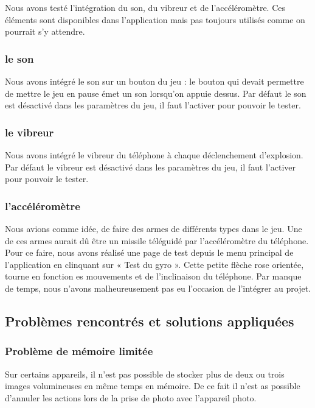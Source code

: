 \documentclass{report}
\begin{document}
Nous avons testé l’intégration du son, du vibreur et de l’accéléromètre.
Ces éléments sont disponibles dans l’application mais pas toujours
utilisés comme on pourrait s’y attendre.

\subsubsection{le son}

Nous avons intégré le son sur un bouton du jeu : le bouton qui devait
permettre de mettre le jeu en pause émet un son lorsqu’on appuie dessus.
Par défaut le son est désactivé dans les paramètres du jeu, il faut
l’activer pour pouvoir le tester.

\subsubsection{le vibreur}

Nous avons intégré le vibreur du téléphone à chaque déclenchement
d’explosion. Par défaut le vibreur est désactivé dans les paramètres du
jeu, il faut l’activer pour pouvoir le tester.

\subsubsection{l’accéléromètre}

Nous avions comme idée, de faire des armes de différents types dans le
jeu. Une de ces armes aurait dû être un missile téléguidé par
l’accéléromètre du téléphone. Pour ce faire, nous avons réalisé une page
de test depuis le menu principal de l’application en clinquant sur
« Test du gyro ». Cette petite flèche rose orientée, tourne en fonction
es mouvements et de l’inclinaison du téléphone. Par manque de temps, nous
n’avons malheureusement pas eu l’occasion de l’intégrer au projet.

\subsection{Problèmes rencontrés et solutions appliquées}
\bigskip


\subsubsection{Problème de mémoire limitée}

Sur certains appareils, il n’est pas possible de stocker plus de deux ou
trois images volumineuses en même temps en mémoire. De ce fait il n’est
as possible d’annuler les actions lors de la prise de photo avec
l’appareil photo.
\end{document}

